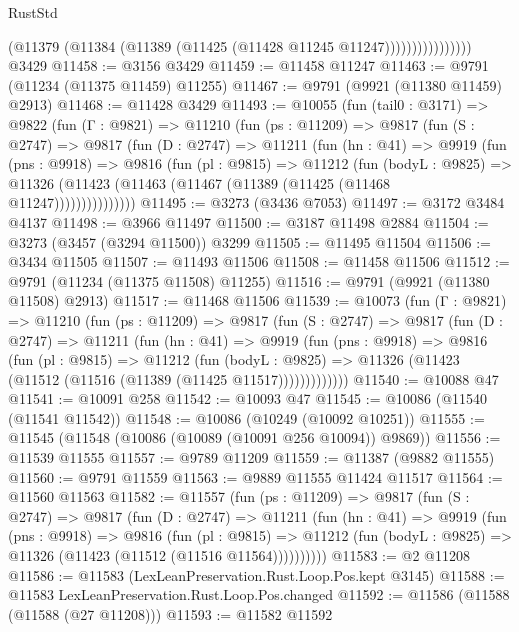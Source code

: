 \begin{lexlean}{RustStd}
\begin{coremodule}
                          (@11379 (@11384 (@11389 (@11425 (@11428 @11245 @11247))))))))))))))))
    @3429
@11458 := @3156 @3429
@11459 := @11458 @11247
@11463 := @9791 (@11234 (@11375 @11459) @11255)
@11467 := @9791 (@9921 (@11380 @11459) @2913)
@11468 := @11428 @3429
@11493 := @10055
    (fun (tail0 : @3171) =>
    @9822
      (fun (Γ : @9821) =>
      @11210
        (fun (ps : @11209) =>
        @9817
          (fun (S : @2747) =>
          @9817
            (fun (D : @2747) =>
            @11211
              (fun (hn : @41) =>
              @9919
                (fun (pns : @9918) =>
                @9816
                  (fun (pl : @9815) =>
                  @11212
                    (fun (bodyL : @9825) =>
                    @11326 (@11423 (@11463 (@11467 (@11389 (@11425 (@11468 @11247)))))))))))))))
@11495 := @3273 (@3436 @7053)
@11497 := @3172 @3484 @4137
@11498 := @3966 @11497
@11500 := @3187 @11498 @2884
@11504 := @3273 (@3457 (@3294 @11500)) @3299
@11505 := @11495 @11504
@11506 := @3434 @11505
@11507 := @11493 @11506
@11508 := @11458 @11506
@11512 := @9791 (@11234 (@11375 @11508) @11255)
@11516 := @9791 (@9921 (@11380 @11508) @2913)
@11517 := @11468 @11506
@11539 := @10073
    (fun (Γ : @9821) =>
    @11210
      (fun (ps : @11209) =>
      @9817
        (fun (S : @2747) =>
        @9817
          (fun (D : @2747) =>
          @11211
            (fun (hn : @41) =>
            @9919
              (fun (pns : @9918) =>
              @9816
                (fun (pl : @9815) =>
                @11212
                  (fun (bodyL : @9825) =>
                  @11326 (@11423 (@11512 (@11516 (@11389 (@11425 @11517)))))))))))))
@11540 := @10088 @47
@11541 := @10091 @258
@11542 := @10093 @47
@11545 := @10086 (@11540 (@11541 @11542))
@11548 := @10086 (@10249 (@10092 @10251))
@11555 := @11545 (@11548 (@10086 (@10089 (@10091 @256 @10094)) @9869))
@11556 := @11539 @11555
@11557 := @9789 @11209
@11559 := @11387 (@9882 @11555)
@11560 := @9791 @11559
@11563 := @9889 @11555 @11424 @11517
@11564 := @11560 @11563
@11582 := @11557
    (fun (ps : @11209) =>
    @9817
      (fun (S : @2747) =>
      @9817
        (fun (D : @2747) =>
        @11211
          (fun (hn : @41) =>
          @9919
            (fun (pns : @9918) =>
            @9816
              (fun (pl : @9815) =>
              @11212 (fun (bodyL : @9825) => @11326 (@11423 (@11512 (@11516 @11564))))))))))
@11583 := @2 @11208
@11586 := @11583 (LexLeanPreservation.Rust.Loop.Pos.kept @3145)
@11588 := @11583 LexLeanPreservation.Rust.Loop.Pos.changed
@11592 := @11586 (@11588 (@11588 (@27 @11208)))
@11593 := @11582 @11592

\end{coremodule}
\end{lexlean}
